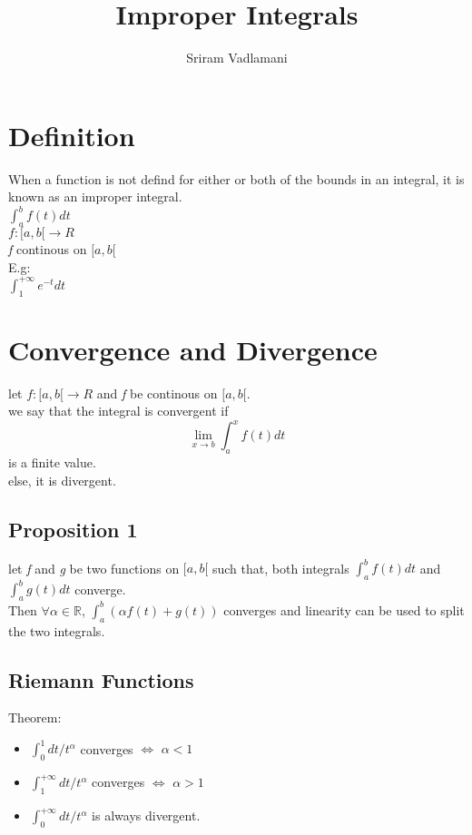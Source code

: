 \documentclass{article}
\title{Improper Integrals}
\author{Sriram Vadlamani}
\begin{document}
\maketitle
\newpage
\tableofcontents
\newpage
\section{Definition}
When a function is not defind for either or both of the bounds in an integral, it is known as an improper integral.\\
$\int _ { a } ^ { b } f ( t ) d t$\\
$f: [ a , b [ \rightarrow R $\\
\textit{f} continous on $[ a , b [$\\

E.g:\\
$\int _ { 1 } ^ { + \infty } e ^ { - t } d t$\\
\section{Convergence and Divergence}
let $f: [a, b[ \rightarrow R $  and \textit{f} be continous on $[a, b[$.\\
we say that the integral is convergent if\\
$$\lim_{x\to b} \int_{a}^{x} f(t) dt$$ is a finite value.\\
else, it is divergent.\\
\subsection{Proposition 1}
let \textit{f} and \textit{g} be two functions on $[ a, b [$ such that, both integrals 
$\int_{a}^{b} f(t) dt$ and $\int_{a}^{b} g(t) dt$ converge.\\
Then
$ \forall \alpha \in \mathbb{R} $, $\int_{a}^{b} (\alpha f(t) + g(t))$ converges and linearity can be used to split the two integrals.\\
\subsection{Riemann Functions}
Theorem:\\
\begin{itemize}
    \item $\int_{0}^{1} dt / t ^ \alpha $ converges $ \Leftrightarrow $ $ \alpha < 1 $\\
    \item $\int_{1}^{+\infty} dt / t ^ \alpha $ converges $ \Leftrightarrow $ $\alpha > 1$\\
    \item $\int_{0}^{+\infty} dt / t ^ \alpha $ is always divergent.\\
\end{itemize}
\end{document}
